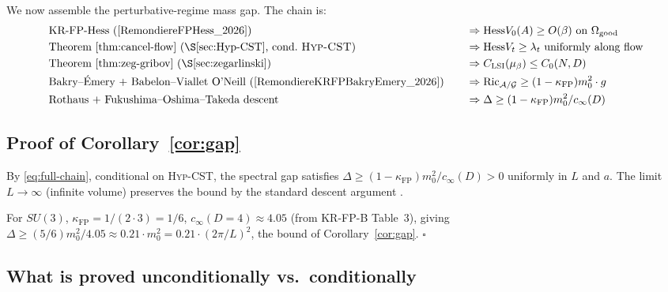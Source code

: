 \documentclass[11pt,a4paper]{amsart}
\theoremstyle{definition}
\newcommand{\Ric}{\mathrm{Ric}}
\newcommand{\Hess}{\mathrm{Hess}}
\newcommand{\kFP}{\kappa_{\mathrm{FP}}}
\begin{document}
We now assemble the perturbative-regime mass gap. The chain is:
\begin{equation}\label{eq:full-chain}
\begin{aligned}
&\text{KR-FP-Hess (\cite{RemondiereFPHess_2026})} \quad &&\Rightarrow \Hess V_0(A) \geq O(\beta) \text{ on } \Omega_{\mathrm{good}} \\
&\text{Theorem~\ref{thm:cancel-flow} (\S\ref{sec:Hyp-CST}, cond.\ \textsc{Hyp-CST})} \quad &&\Rightarrow \Hess V_t \geq \lambda_t \text{ uniformly along flow} \\
&\text{Theorem~\ref{thm:zeg-gribov} (\S\ref{sec:zegarlinski})} \quad &&\Rightarrow C_{\mathrm{LSI}}(\mu_\beta) \leq C_0(N, D) \\
&\text{Bakry--\'Emery + Babelon--Viallet O'Neill (\cite{RemondiereKRFPBakryEmery_2026})} \quad &&\Rightarrow \Ric_{\mathcal A/\mathcal G} \geq (1-\kFP) m_0^2 \cdot g \\
&\text{Rothaus + Fukushima--Oshima--Takeda descent} \quad &&\Rightarrow \Delta \geq (1-\kFP) m_0^2 / c_\infty(D)
\end{aligned}
\end{equation}

\subsection{Proof of Corollary~\ref{cor:gap}}

By \eqref{eq:full-chain}, conditional on \textsc{Hyp-CST}, the spectral gap
satisfies $\Delta \geq (1-\kFP) m_0^2 / c_\infty(D) > 0$ uniformly in
$L$ and $a$. The limit $L \to \infty$ (infinite volume) preserves the
bound by the standard descent argument \cite[\S 5]{RemondiereKRFPBakryEmery_2026}.

For $SU(3)$, $\kFP = 1/(2 \cdot 3) = 1/6$, $c_\infty(D=4) \approx 4.05$
(from KR-FP-B Table~3), giving $\Delta \geq (5/6) m_0^2 / 4.05 \approx
0.21 \cdot m_0^2 = 0.21 \cdot (2\pi/L)^2$, the bound of
Corollary~\ref{cor:gap}. \hfill $\square$

\subsection{What is proved unconditionally vs.\ conditionally}
\end{document}
